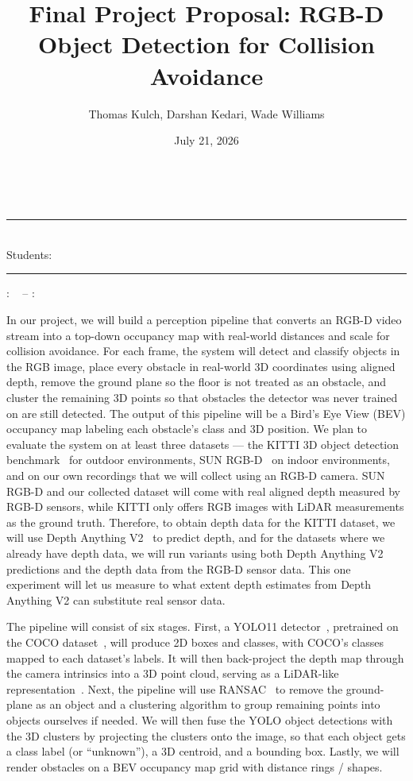 \documentclass[
  12pt,
]{fphw}
\title{Final Project Proposal: RGB-D Object Detection for Collision Avoidance}
\author{Thomas Kulch, Darshan Kedari, Wade Williams}
\date{July 21, 2026}
\institute{Northeastern University // Khoury College of Computer Science}
\makeatletter
\renewcommand{\StudentLang}{Students}
\renewcommand{\maketitle}{%
    \thispagestyle{plain}
    \begin{center}
        \ifx\instituteloc\undefined{}\else{\scshape \instituteloc} \\[4pt] \fi
        \hrule
        \vspace{6pt}
        {\Large \bfseries \@title} \\[3pt]
        \StudentLang: {\itshape \@author}
        \vspace{4pt}
        \hrule
        \vspace{6pt}
        \ifx\classlocal\undefined{}\else\CourseLang: {\itshape \classlocal{} \ifx\professorloc\undefined{}\else{-- }\fi  }\fi
        \ifx\professorloc\undefined{}\else{\ProfessorLang: {\itshape\professorloc\/}}~\fi
        -- \DateLang: {\itshape\@date}
        \vspace{8pt}
    \end{center}
}
\makeatother
\begin{document}
\maketitle


In our project, we will build a perception pipeline that converts an RGB-D video stream into a top-down
occupancy map with real-world distances and scale for collision avoidance. For each frame, the system will
detect and classify objects in the RGB image, place every obstacle in real-world 3D coordinates using
aligned depth, remove the ground plane so the floor is not treated as an obstacle, and cluster the
remaining 3D points so that obstacles the detector was never trained on are still detected. The output of
this pipeline will be a Bird's Eye View (BEV) occupancy map labeling each obstacle's class and 3D
position. We plan to evaluate the system on at least three datasets --- the KITTI 3D object detection
benchmark~\cite{kitti} for outdoor environments, SUN RGB-D~\cite{sunrgbd} on indoor environments, and on
our own recordings that we will collect using an RGB-D camera. SUN RGB-D and our collected dataset will
come with real aligned depth measured by RGB-D sensors, while KITTI only offers RGB images with LiDAR
measurements as the ground truth. Therefore, to obtain depth data for the KITTI dataset, we will use Depth
Anything V2~\cite{depthanything2} to predict depth, and for the datasets where we already have depth data,
we will run variants using both Depth Anything V2 predictions and the depth data from the RGB-D sensor
data. This one experiment will let us measure to what extent depth estimates from Depth Anything V2 can
substitute real sensor data.

The pipeline will consist of six stages. First, a YOLO11 detector~\cite{yolo}, pretrained on the COCO
dataset~\cite{coco}, will produce 2D boxes and classes, with COCO's classes mapped to each dataset's
labels. It will then back-project the depth map through the camera intrinsics into a 3D point cloud,
serving as a LiDAR-like representation~\cite{pseudolidar}. Next, the pipeline will use
RANSAC~\cite{ransac} to remove the ground-plane as an object and a clustering algorithm to group remaining
points into objects ourselves if needed. We will then fuse the YOLO object detections with the 3D clusters
by projecting the clusters onto the image, so that each object gets a class label (or ``unknown''), a 3D
centroid, and a bounding box. Lastly, we will render obstacles on a BEV occupancy map grid with distance
rings / shapes.
\end{document}
